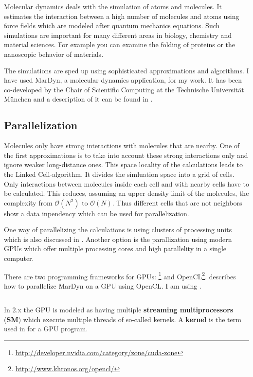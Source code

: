 Molecular dynamics deals with the simulation of atoms and molecules. It estimates the interaction between a high number of molecules and atoms using force fields which are modeled after quantum mechanics equations. 
Such simulations are important for many different areas in biology, chemistry and material sciences. For example you can examine the folding of proteins or the nanoscopic behavior of materials.

The simulations are sped up using sophisticated approximations and algorithms. I have used MarDyn, a molecular dynamics application, for my work. It has been co-developed by the Chair of Scientific Computing at the Technische Universit\"at M\"unchen and a description of it can be found in \cite{buchholz10framework}.

\subsection{Parallelization}
Molecules only have strong interactions with molecules that are nearby. One of the first approximations is to take into account these strong interactions only and ignore weaker long-distance ones.
This space locality of the calculations leads to the Linked Cell-algorithm. It divides the simluation space into a grid of cells. Only interactions between molecules inside each cell and with nearby cells have to be calculated. This reduces, assuming an upper density limit of the molecules,
 the complexity from $ \mathcal{O} \left( N^2 \right) $ to $ \mathcal{O} \left( N \right) $.
Thus different cells that are not neighbors show a data inpendency which can be used for parallelization.

One way of parallelizing the calculations is using clusters of processing units which is also discussed in \cite{buchholz10framework}. Another option is the parallization using modern GPUs which offer multiple processing cores and high parallelity in a single computer.

There are two programming frameworks for GPUs: \cuda{}\footnote{\url{http://developer.nvidia.com/category/zone/cuda-zone}} and OpenCL\footnote{\url{http://www.khronos.org/opencl/}}.
\cite{orend10numerische} describes how to parallelize MarDyn on a GPU using OpenCL. I am using \cuda{}.

\subsection{\cuda{}}
In \cuda{} 2.x the GPU is modeled as having multiple \textbf{streaming multiprocessors} (\textbf{SM}) which execute multiple threads of so-called kernels. A \textbf{kernel} is the term used in \cuda{} for a GPU program.

